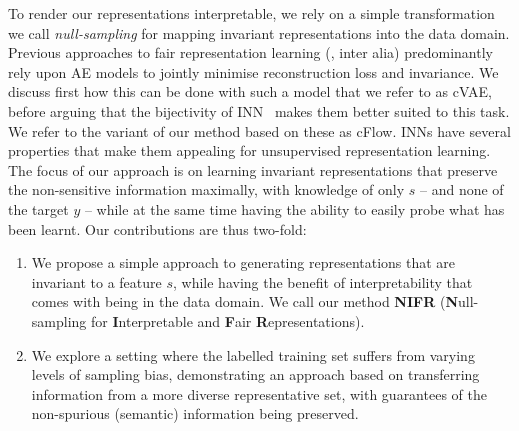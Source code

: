 To render our representations interpretable, we rely on a simple transformation we call
\emph{null-sampling} for mapping invariant representations into the data domain. 
%
Previous approaches to fair representation learning
(\cite{beutel2017data,edwards2016censoring,madras2018learning,louizos2016variational}, inter alia)
predominantly rely upon \ac{AE} models to jointly minimise reconstruction loss and invariance. 
%
We discuss first how this can be done with such a model that we refer to as \ac{cVAE}, before
arguing that the bijectivity of \ac{INN}~\citep{Dinh2014} makes them better suited to this task. 
%
We refer to the variant of our method based on these as \ac{cFlow}. 
%
\Acp{INN} have several properties that make them appealing for unsupervised representation
learning. 
%
The focus of our approach is on learning invariant representations that preserve the non-sensitive
information maximally, with knowledge of only $s$ -- and none of the target $y$ -- while at the
same time having the ability to easily probe what has been learnt.
%
Our contributions are thus two-fold: 
%
\begin{enumerate}
        \item 
            We propose a simple approach to generating representations that are invariant to a
            feature $s$, while having the benefit of interpretability that comes with being in the
            data domain. 
            We call our method \textbf{NIFR} (\textbf{N}ull-sampling for \textbf{I}nterpretable and \textbf{F}air
            \textbf{R}epresentations).
        \item
            We explore a setting where the labelled training set suffers from varying levels of
            sampling bias, demonstrating an approach based on transferring information from a more
            diverse representative set, with guarantees of the non-spurious (semantic) information
            being preserved.
\end{enumerate}
%
